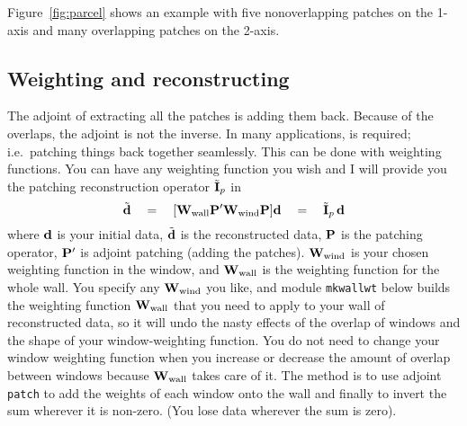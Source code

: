 
Figure~\ref{fig:parcel} shows an example with five
nonoverlapping patches on the 1-axis and many overlapping patches
on the 2-axis.

\subsection{Weighting and reconstructing}
\par
The adjoint of extracting all the patches is adding them back.
Because of the overlaps, the adjoint is not the inverse.
In many applications,  is required;
i.e.~patching things back together seamlessly.
This can be done with weighting functions.
You can have any weighting function you wish
and I will provide you
the patching reconstruction operator $\tilde{\bold I}_p$ in
\begin{equation}
\tilde {\bf d}
\quad = \quad 
[ \bold W_{\rm wall} \bold P' \bold W_{\rm wind} \bold P ] \bold d
\quad = \quad 
\tilde{\bold I}_p \, \bold d
\label{eqn:idemeqn}
\end{equation}
where $\bold d$ is your initial data,
$\tilde{\bf d}$ is the reconstructed data,
$\bold P$ is the patching operator,
$\bold P'$ is adjoint patching (adding the patches).
$\bold W_{\rm wind}$ is your chosen weighting function in the window, and 
$\bold W_{\rm wall}$ is the weighting function
for the whole wall.
You specify any $\bold W_{\rm wind}$ you like,
and module \texttt{mkwallwt} below
builds the weighting function $\bold W_{\rm wall}$
that you need to apply
to your wall of reconstructed data,
so it will undo the nasty effects of the overlap of windows
and the shape of your window-weighting function.
You do not need to change your window weighting function
when you increase or decrease the amount of overlap
between windows because
$\bold W_{\rm wall}$
takes care of it.
The method is to
use adjoint \texttt{patch} 
to add the weights of each window onto the wall
and finally to invert the sum wherever it is non-zero.
(You lose data wherever the sum is zero).


